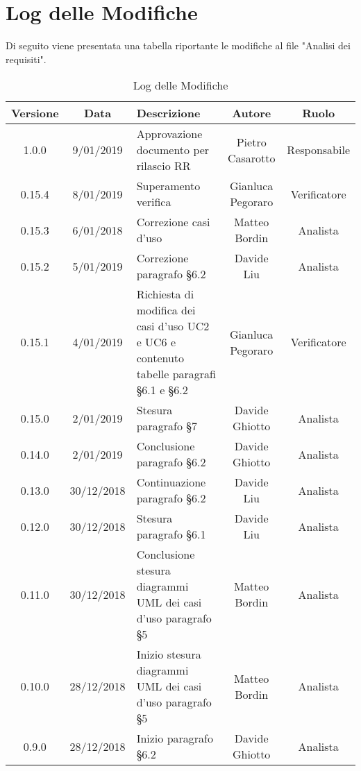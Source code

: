 	\section{Log delle Modifiche}
Di seguito viene presentata una tabella riportante le modifiche al file "Analisi dei requisiti".

\begin{table}[!h] %
            \centering
            \renewcommand{\arraystretch}{2}
            \begin{tabular}{|c|c|p{5cm}|c|c|} %
                \rowcolor{orange!50} %
        		\hline
        		\textbf{Versione} & \textbf{Data} & \textbf{Descrizione} & \textbf{Autore} & \textbf{Ruolo} \\
                \hline
                1.0.0 & 9/01/2019 & Approvazione documento per rilascio RR & Pietro Casarotto & Responsabile \\
                \hline
                0.15.4 & 8/01/2019 & Superamento verifica & Gianluca Pegoraro & Verificatore \\
                \hline
                0.15.3 & 6/01/2018 & Correzione casi d’uso & Matteo Bordin & Analista \\
                \hline
                0.15.2 & 5/01/2019 & Correzione paragrafo §6.2 & Davide Liu & Analista \\
                \hline
                0.15.1 & 4/01/2019 & Richiesta di modifica dei casi d’uso UC2 e UC6 e contenuto tabelle paragrafi §6.1 e §6.2 & Gianluca Pegoraro & Verificatore \\
                \hline
                0.15.0 & 2/01/2019 & Stesura paragrafo §7 & Davide Ghiotto & Analista \\
                \hline
                0.14.0 & 2/01/2019 & Conclusione paragrafo §6.2 & Davide Ghiotto & Analista \\
                \hline
                0.13.0 & 30/12/2018 & Continuazione paragrafo §6.2 & Davide Liu & Analista \\
                \hline
                0.12.0 & 30/12/2018 & Stesura paragrafo §6.1 & Davide Liu & Analista \\
                \hline
                0.11.0 & 30/12/2018 & Conclusione stesura diagrammi UML dei casi d’uso paragrafo §5 & Matteo Bordin & Analista \\
                \hline
                0.10.0 & 28/12/2018 & Inizio stesura diagrammi UML dei casi d'uso paragrafo §5 & Matteo Bordin & Analista \\
                \hline
                0.9.0 & 28/12/2018 & Inizio paragrafo §6.2 & Davide Ghiotto & Analista \\
                \hline
                
        \end{tabular}
        \caption{Log delle Modifiche} %
        \label{tab:Log delle modifiche}
\end{table}

